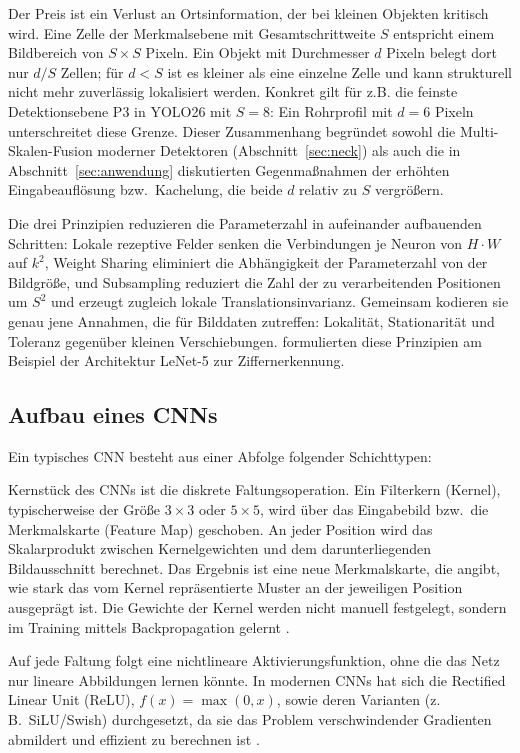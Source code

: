 Der Preis ist ein Verlust an Ortsinformation, der bei kleinen Objekten kritisch
wird. Eine Zelle der Merkmalsebene mit Gesamtschrittweite $S$ entspricht einem
Bildbereich von $S \times S$ Pixeln. Ein Objekt mit Durchmesser $d$ Pixeln
belegt dort nur $d/S$ Zellen; für $d < S$ ist es kleiner als eine einzelne Zelle
und kann strukturell nicht mehr zuverlässig lokalisiert werden. Konkret gilt für
z.B. die feinste Detektionsebene P3 in YOLO26 mit $S = 8$: Ein Rohrprofil mit $d = 6$ Pixeln
unterschreitet diese Grenze. Dieser Zusammenhang begründet sowohl die
Multi-Skalen-Fusion moderner Detektoren (Abschnitt~\ref{sec:neck}) als auch die
in Abschnitt~\ref{sec:anwendung} diskutierten Gegenmaßnahmen der erhöhten
Eingabeauflösung bzw.\ Kachelung, die beide $d$ relativ zu $S$ vergrößern.

 Die drei Prinzipien reduzieren die Parameterzahl in
aufeinander aufbauenden Schritten: Lokale rezeptive Felder senken die
Verbindungen je Neuron von $H \cdot W$ auf $k^2$, Weight Sharing eliminiert die
Abhängigkeit der Parameterzahl von der Bildgröße, und Subsampling reduziert die
Zahl der zu verarbeitenden Positionen um $S^2$ und erzeugt zugleich lokale
Translationsinvarianz. Gemeinsam kodieren sie genau jene Annahmen, die für
Bilddaten zutreffen: Lokalität, Stationarität und Toleranz gegenüber kleinen
Verschiebungen. \textcite{lecun1998} formulierten diese Prinzipien am Beispiel
der Architektur LeNet-5 zur Ziffernerkennung.

\subsection{Aufbau eines CNNs}

Ein typisches CNN besteht aus einer Abfolge folgender Schichttypen:

 Kernstück des CNNs ist die
diskrete Faltungsoperation. Ein Filterkern (Kernel), typischerweise der Größe
$3\times3$ oder $5\times5$, wird über das Eingabebild bzw.\ die Merkmalskarte
(Feature Map) geschoben. An jeder Position wird das Skalarprodukt zwischen
Kernelgewichten und dem darunterliegenden Bildausschnitt berechnet. Das Ergebnis
ist eine neue Merkmalskarte, die angibt, wie stark das vom Kernel
repräsentierte Muster an der jeweiligen Position ausgeprägt ist. Die Gewichte der
Kernel werden nicht manuell festgelegt, sondern im Training mittels
Backpropagation gelernt \parencite{lecun1998,goodfellow2016}.

 Auf jede Faltung folgt eine nichtlineare
Aktivierungsfunktion, ohne die das Netz nur lineare Abbildungen lernen könnte.
In modernen CNNs hat sich die Rectified Linear Unit (ReLU),
$f(x) = \max(0, x)$, sowie deren Varianten (z.\,B.\ SiLU/Swish) durchgesetzt, da
sie das Problem verschwindender Gradienten abmildert und effizient zu berechnen
ist \parencite{krizhevsky2012}.

